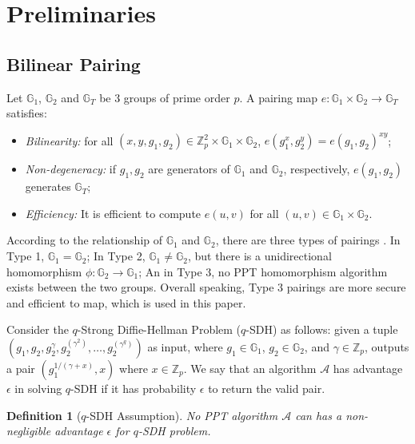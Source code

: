 \documentclass[conference]{IEEEtran}
\newtheorem{definition}{Definition}
\begin{document}
\section{Preliminaries}\label{sec:preliminary}

\subsection{Bilinear Pairing}
Let $\mathbb{G}_1$, $\mathbb{G}_2$ and $\mathbb{G}_T$ be 3 groups of prime order $p$. A pairing map $e:\mathbb{G}_1\times \mathbb{G}_2\rightarrow\mathbb{G}_T$ satisfies:
\begin{itemize}
	\item \textit{Bilinearity:} for all $(x,y, g_1, g_2) \in \mathbb{Z}_p^2\times \mathbb{G}_1\times \mathbb{G}_2$, $e(g_1^x, g_2^y) = e(g_1, g_2)^{xy}$;
	\item \textit{Non-degeneracy:} if $g_1, g_2$ are generators of $\mathbb{G}_1$ and $\mathbb{G}_2$, respectively, $e(g_1, g_2)$ generates $\mathbb{G}_T$;
	\item \textit{Efficiency:} It is efficient to compute $e(u,v)$ for all $(u, v) \in \mathbb{G}_1\times \mathbb{G}_2$.
\end{itemize}

According to the relationship of $\mathbb{G}_1$ and $\mathbb{G}_2$, there are three types of pairings \cite{GALBRAITH20083113}. 
In Type 1, $\mathbb{G}_1 = \mathbb{G}_2$; In Type 2, $\mathbb{G}_1 \neq \mathbb{G}_2$, but there is a unidirectional homomorphism $\phi:\mathbb{G}_2 \rightarrow \mathbb{G}_1$; An in Type 3, no PPT homomorphism algorithm exists between the two groups.
Overall speaking, Type 3 pairings are more secure and efficient to map, which is used in this paper.

Consider the $q$-Strong Diffie-Hellman Problem ($q$-SDH) \cite{Boneh2004} as follows: given a tuple $(g_1, g_2, g_2^{\gamma}, g_2^{(\gamma^2)}, \dots, g_2^{(\gamma^q)})$ as input, where $g_1\in\mathbb{G}_1$, $g_2\in\mathbb{G}_2$, and $\gamma\in \mathbb{Z}_p$, outputs a pair $(g_1^{1/(\gamma + x)}, x)$ where $x \in \mathbb{Z}_p$. We say that an algorithm $\mathcal{A}$ has advantage $\epsilon$ in solving $q$-SDH if it has probability $\epsilon$ to return the valid pair.

\begin{definition}[$q$-SDH Assumption]
	No PPT algorithm $\mathcal{A}$ can has a non-negligible advantage $\epsilon$ for $q$-SDH problem.
\end{definition}
\end{document}
